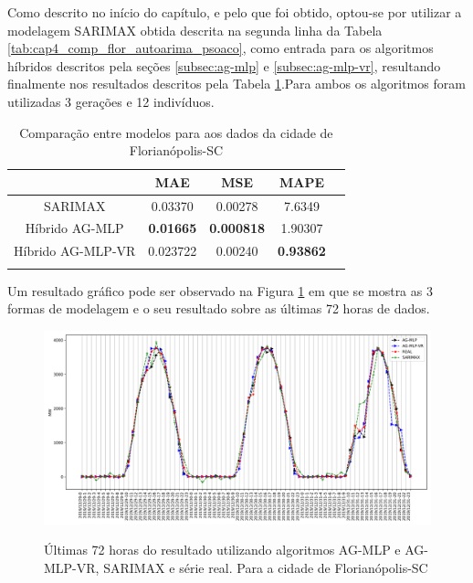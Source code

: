 Como descrito no início do capítulo, e pelo que foi obtido, optou-se por utilizar a modelagem SARIMAX obtida descrita na segunda linha da Tabela \ref{tab:cap4_comp_flor_autoarima_psoaco}, como entrada para os algoritmos híbridos descritos pela seções \ref{subsec:ag-mlp} e \ref{subsec:ag-mlp-vr}, resultando finalmente nos resultados descritos pela Tabela \ref{tab:cap4_comp_flor_agmlp_agmlpvr}.Para ambos os algoritmos foram utilizadas 3 gerações e 12 indivíduos.

\begin{table}[htbp]
\caption{Comparação entre modelos para aos dados da cidade de Florianópolis-SC}
\begin{center}
\begin{tabular}{ccccc}
                & MAE & MSE & MAPE \\\hline
SARIMAX         & 0.03370 & 0.00278 & 7.6349 \\\hline
Híbrido AG-MLP  & \textbf{0.01665} & \textbf{0.000818} & 1.90307 \\\hline
Híbrido AG-MLP-VR & 0.023722 & 0.00240 & \textbf{0.93862} \\\hline
\label{tab:cap4_comp_flor_agmlp_agmlpvr}
\end{tabular}
\end{center}
\end{table}

Um resultado gráfico pode ser observado na Figura \ref{fig:cap4_flor_3_days_hibrids} em que se mostra as 3 formas de modelagem e o seu resultado sobre as últimas 72 horas de dados.

\begin{figure}[!htbp]
    \centering
    \caption{Últimas 72 horas do resultado utilizando algoritmos AG-MLP e AG-MLP-VR, SARIMAX e série real. Para a cidade de Florianópolis-SC}
    \includegraphics[width=\textwidth]{Figuras/results/comparison_hibrids_fl.png}
    \label{fig:cap4_flor_3_days_hibrids}
\end{figure}

